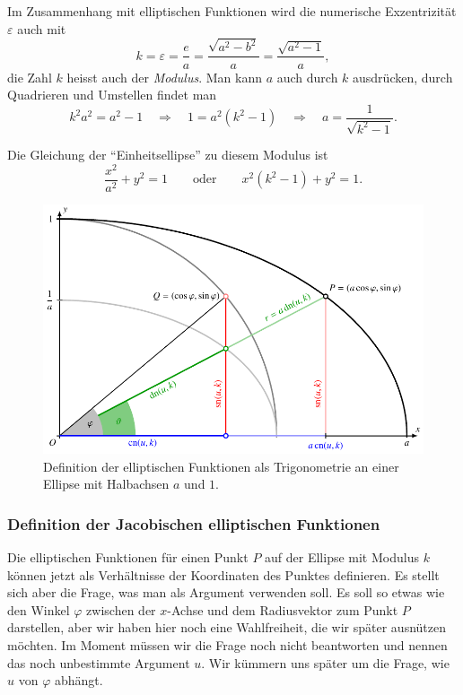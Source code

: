 Im Zusammenhang mit elliptischen Funktionen wird die numerische Exzentrizität
$\varepsilon$ auch mit
\[
k
=
\varepsilon
=
\frac{e}{a}
=
\frac{\sqrt{a^2-b^2}}{a}
=
\frac{\sqrt{a^2-1}}{a},
\]
die Zahl $k$ heisst auch der {\em Modulus}.
Man kann $a$ auch durch $k$ ausdrücken, durch Quadrieren und Umstellen
findet man
\[
k^2a^2 = a^2-1
\quad\Rightarrow\quad
1=a^2(k^2-1)
\quad\Rightarrow\quad
a=\frac{1}{\sqrt{k^2-1}}.
\]

Die Gleichung der ``Einheitsellipse'' zu diesem Modulus ist
\[
\frac{x^2}{a^2}+y^2=1
\qquad\text{oder}\qquad
x^2(k^2-1) + y^2 = 1.
\]

%
%
\begin{figure}
\centering
\includegraphics{chapters/110-elliptisch/images/jacobidef.pdf}
\caption{Definition der elliptischen Funktionen als Trigonometrie
an einer Ellipse mit Halbachsen $a$ und $1$.
\label{buch:elliptisch:fig:jacobidef}}
\end{figure}
\subsubsection{Definition der Jacobischen elliptischen Funktionen}
Die elliptischen Funktionen für einen Punkt $P$ auf der Ellipse mit Modulus $k$
können jetzt als Verhältnisse der Koordinaten des Punktes definieren.
Es stellt sich aber die Frage, was man als Argument verwenden soll.
Es soll so etwas wie den Winkel $\varphi$ zwischen der $x$-Achse und dem
Radiusvektor zum Punkt $P$
darstellen, aber wir haben hier noch eine Wahlfreiheit, die wir später
ausnützen möchten.
Im Moment müssen wir die Frage noch nicht beantworten und nennen das
noch unbestimmte Argument $u$.
Wir kümmern uns später um die Frage, wie $u$ von $\varphi$ abhängt.

